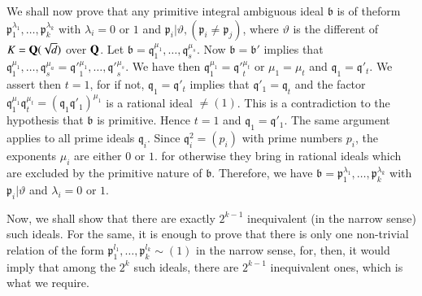 We shall now prove that any primitive integral ambiguous ideal
$\mathfrak{b}$ is of the\pageoriginale form
$\mathfrak{p}^{\lambda_{1}}_{1},\ldots,\mathfrak{p}^{\lambda_{k}}_{k}$
with $\lambda_{i}=0$ or $1$ and
$\mathfrak{p}_{i}|\vartheta,(\mathfrak{p}_{i}\neq \mathfrak{p}_{j})$,
where $\vartheta$ is the different of $K=\mathbf{Q}(\sqrt{d})$ over
$\mathbf{Q}$. Let
$\mathfrak{b}=\mathfrak{q}^{\mu_{1}}_{1},\ldots,\mathfrak{q}^{\mu_{s}}_{s}$. Now
$\mathfrak{b}=\mathfrak{b}'$ implies that
$\mathfrak{q}^{\mu_{1}}_{1},\ldots,\mathfrak{q}^{\mu_{a}}_{s}={\mathfrak{q}'}^{\mu_{1}}_{1},\ldots,{\mathfrak{q}'}^{\mu_{s}}_{s}$. We
have then $\mathfrak{q}^{\mu_{1}}_{1}={\mathfrak{q}'}^{\mu_{t}}_{t}$
or $\mu_{1}=\mu_{t}$ and $\mathfrak{q}_{1}=\mathfrak{q}'_{t}$. We
assert then $t=1$, for if not, $\mathfrak{q}_{1}=\mathfrak{q}'_{t}$
implies that $\mathfrak{q}'_{1}=\mathfrak{q}_{t}$ and the factor
$\mathfrak{q}^{\mu_{1}}_{1}\mathfrak{q}^{\mu_{t}}_{t}=(\mathfrak{q}_{1}\mathfrak{q}'_{1})^{\mu_{1}}$
is a rational ideal $\neq (1)$. This is a contradiction to the
hypothesis that $\mathfrak{b}$ is primitive. Hence $t=1$ and
$\mathfrak{q}_{1}=\mathfrak{q}'_{1}$. The same argument applies to all
prime ideals $\mathfrak{q}_{i}$. Since $\mathfrak{q}^{2}_{i}=(p_{i})$
with prime numbers $p_{i}$, the exponents $\mu_{i}$ are either $0$ or
$1$. for otherwise they bring in rational ideals which are excluded by
the primitive nature of $\mathfrak{b}$. Therefore, we have
$\mathfrak{b}=\mathfrak{p}^{\lambda_{1}}_{1},\ldots,\mathfrak{p}^{\lambda_{k}}_{k}$
with $\mathfrak{p}_{i}|\vartheta$ and $\lambda_{i}=0$ or $1$.

Now, we shall show that there are exactly $2^{k-1}$ inequivalent (in
the narrow sense) such ideals. For the same, it is enough to prove
that there is only one non-trivial relation of the form
$\mathfrak{p}^{l_{1}}_{1},\ldots,\mathfrak{p}^{l_{k}}_{k}\sim (1)$ in
the narrow sense, for, then, it would imply that among the $2^{k}$
such ideals, there are $2^{k-1}$ inequivalent ones, which is what we
require.

